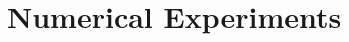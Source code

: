\documentclass[12pt,a4paper]{article}
\newcommand{\bx}{\mathbf{x}}
\begin{document}
		
		
		\color{black}
		

\section{Numerical Experiments \label{sec:experiments}}
\end{document}
